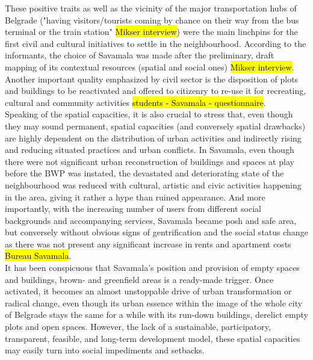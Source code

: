 \documentclass[11pt]{report}
\begin{document}
These positive traits as well as the vicinity of the major transportation hubs of Belgrade ("having visitors/tourists coming by chance on their way from the bus terminal or the train station" \hl{Mikser interview}) were the main linchpins for the first civil and cultural initiatives to settle in the neighbourhood. According to the informants, the choice of Savamala was made after the preliminary, draft mapping of its contextual resources (spatial and social ones) \hl{Mikser interview}.
Another important quality emphasized by civil sector is the disposition of plots and buildings to be reactivated and offered to citizenry to re-use it for recreating, cultural and community activities \hl{students - Savamala - questionnaire}.
\\
Speaking of the spatial capacities, it is also crucial to stress that, even though they may sound permanent, spatial capacities (and conversely spatial drawbacks) are highly dependent on the distribution of urban activities and indirectly rising and reducing situated practices and urban conflicts.
In Savamala, even though there were not significant urban reconstruction of buildings and spaces at play before the BWP was instated, the devastated and deteriorating state of the neighbourhood was reduced with cultural, artistic and civic activities happening in the area, giving it rather a hype than ruined appearance. And more importantly, with the increasing number of users from different social backgrounds and accompanying services, Savamala became posh and safe area, but conversely without obvious signs of gentrification and the social status change as there was not present any significant increase in rents and apartment costs \hl{Bureau Savamala}.
\\
It has been conspicuous that Savamala's position and provision of empty spaces and buildings, brown- and greenfield areas is a ready-made trigger. Once activated, it becomes an almost unstoppable drive of urban transformation or radical change, even though its urban essence within the image of the whole city of Belgrade stays the same for a while with its run-down buildings, derelict empty plots and open spaces.\footnotemark
However, the lack of a sustainable, participatory, transparent, feasible, and long-term development model, these spatial capacities may easily turn into social impediments and setbacks.
\end{document}
